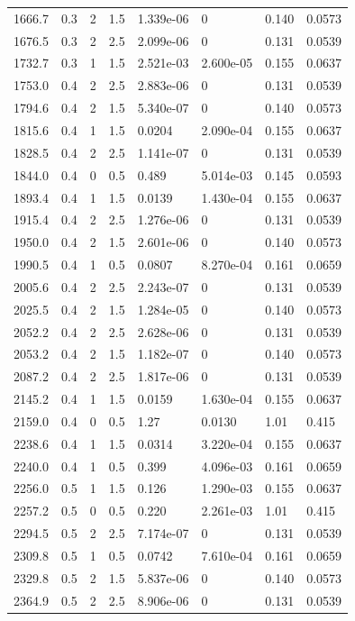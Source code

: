 \documentclass[preview]{standalone}
\begin{document}
{{{\begin{tabular}{L{1.2cm}C{1.2cm} C{0.3cm}C{0.5cm} C{1.4cm}C{1.4cm} C{1.4cm}C{1.4cm}}
  1666.7  &   0.3  & 2     & 1.5 &  1.339e-06  & 0  & 0.140 &  0.0573   \\ 
  1676.5  &   0.3  & 2     & 2.5 &  2.099e-06  & 0  & 0.131 &  0.0539   \\ 
  1732.7  &   0.3  & 1     & 1.5 &  2.521e-03  & 2.600e-05  & 0.155 &  0.0637   \\ 
  1753.0  &   0.4  & 2     & 2.5 &  2.883e-06  & 0  & 0.131 &  0.0539   \\ 
  1794.6  &   0.4  & 2     & 1.5 &  5.340e-07  & 0  & 0.140 &  0.0573   \\ 
  1815.6  &   0.4  & 1     & 1.5 &  0.0204  & 2.090e-04  & 0.155 &  0.0637   \\ 
  1828.5  &   0.4  & 2     & 2.5 &  1.141e-07  & 0  & 0.131 &  0.0539   \\ 
  1844.0  &   0.4  & 0     & 0.5 &  0.489  & 5.014e-03  & 0.145 &  0.0593   \\ 
  1893.4  &   0.4  & 1     & 1.5 &  0.0139  & 1.430e-04  & 0.155 &  0.0637   \\ 
  1915.4  &   0.4  & 2     & 2.5 &  1.276e-06  & 0  & 0.131 &  0.0539   \\ 
  1950.0  &   0.4  & 2     & 1.5 &  2.601e-06  & 0  & 0.140 &  0.0573   \\ 
  1990.5  &   0.4  & 1     & 0.5 &  0.0807  & 8.270e-04  & 0.161 &  0.0659   \\ 
  2005.6  &   0.4  & 2     & 2.5 &  2.243e-07  & 0  & 0.131 &  0.0539   \\ 
  2025.5  &   0.4  & 2     & 1.5 &  1.284e-05  & 0  & 0.140 &  0.0573   \\ 
  2052.2  &   0.4  & 2     & 2.5 &  2.628e-06  & 0  & 0.131 &  0.0539   \\ 
  2053.2  &   0.4  & 2     & 1.5 &  1.182e-07  & 0  & 0.140 &  0.0573   \\ 
  2087.2  &   0.4  & 2     & 2.5 &  1.817e-06  & 0  & 0.131 &  0.0539   \\ 
  2145.2  &   0.4  & 1     & 1.5 &  0.0159  & 1.630e-04  & 0.155 &  0.0637   \\ 
  2159.0  &   0.4  & 0     & 0.5 &  1.27  & 0.0130  & 1.01 &  0.415   \\ 
  2238.6  &   0.4  & 1     & 1.5 &  0.0314  & 3.220e-04  & 0.155 &  0.0637   \\ 
  2240.0  &   0.4  & 1     & 0.5 &  0.399  & 4.096e-03  & 0.161 &  0.0659   \\ 
  2256.0  &   0.5  & 1     & 1.5 &  0.126  & 1.290e-03  & 0.155 &  0.0637   \\ 
  2257.2  &   0.5  & 0     & 0.5 &  0.220  & 2.261e-03  & 1.01 &  0.415   \\ 
  2294.5  &   0.5  & 2     & 2.5 &  7.174e-07  & 0  & 0.131 &  0.0539   \\ 
  2309.8  &   0.5  & 1     & 0.5 &  0.0742  & 7.610e-04  & 0.161 &  0.0659   \\ 
  2329.8  &   0.5  & 2     & 1.5 &  5.837e-06  & 0  & 0.140 &  0.0573   \\ 
  2364.9  &   0.5  & 2     & 2.5 &  8.906e-06  & 0  & 0.131 &  0.0539   \\ 
\hline 
\end{tabular} 

}}}
\end{document}
